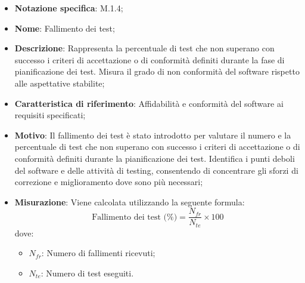 \begin{itemize}
    \item \textbf{Notazione specifica}: M.1.4;
    \item \textbf{Nome}: Fallimento dei test;
    \item \textbf{Descrizione}: Rappresenta la percentuale di test che non superano con successo i criteri di accettazione o di conformità definiti durante la fase di pianificazione dei test. Misura il grado di non conformità del software rispetto alle aspettative stabilite;
    \item \textbf{Caratteristica di riferimento}: Affidabilità e conformità del software ai requisiti specificati;
    \item \textbf{Motivo}: Il fallimento dei test è stato introdotto per valutare il numero e la percentuale di test che non superano con successo i criteri di accettazione o di conformità definiti durante la pianificazione dei test. Identifica i punti deboli del software e delle attività di testing, consentendo di concentrare gli sforzi di correzione e miglioramento dove sono più necessari;
    \item \textbf{Misurazione}: Viene calcolata utilizzando la seguente formula:
    \[
    \text{Fallimento dei test (\%)} = \frac{N_{fr}}{N_{te}} \times 100
    \]
    dove:
    \begin{itemize}
        \item $N_{fr}$: Numero di fallimenti ricevuti;
        \item $N_{te}$: Numero di test eseguiti.
    \end{itemize}
    \end{itemize}
